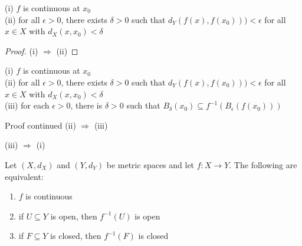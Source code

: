 \documentclass [aspectratio=169]{beamer}
\newcommand{\inv}{{-1}}
\begin{document}
\begin{frame}
\small
(i) $f$ is continuous at $x_0$ \\
(ii) for all $\epsilon>0$, there exists $\delta > 0$ such that $d_Y(f(x),f(x_0))) < \epsilon$ for all $x \in X$ with $d_X(x,x_0) < \delta$

\normalsize
\begin{proof}
(i) $\Rightarrow$ (ii) 
\vspace{4cm}

\end{proof}

\end{frame}


\begin{frame}
\small
(i) $f$ is continuous at $x_0$ \\
(ii) for all $\epsilon>0$, there exists $\delta > 0$ such that $d_Y(f(x),f(x_0))) < \epsilon$ for all $x \in X$ with $d_X(x,x_0) < \delta$ \\
(iii) for each $\epsilon>0$, there is $\delta > 0$ such that $B_\delta(x_0) \subseteq f^{-1} (B_\epsilon(f(x_0)))$
\normalsize
\begin{block}{Proof continued}
(ii) $\Rightarrow$ (iii)

\vspace{0.5cm}
(iii) $\Rightarrow$ (i)

\vspace{3cm}
\end{block}
\end{frame}


\begin{frame}
\begin{corollary}
\label{cor:open_closed}
Let $(X,d_X)$ and $(Y,d_Y)$ be metric spaces and let $f:X\to Y$. The following are equivalent:
\begin{enumerate}
    \item[(i)] $f$ is continuous
    \item[(ii)] if $U \subseteq Y$ is open, then $f^\inv(U)$ is open
    \item[(iii)] if $F \subseteq Y$ is closed, then $f^\inv(F)$ is closed
\end{enumerate}
\end{corollary}

\end{frame}
\end{document}
